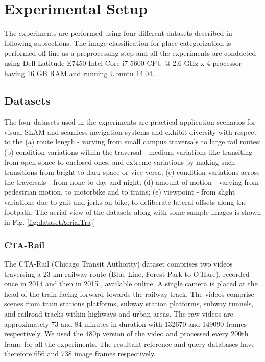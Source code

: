 \documentclass[letterpaper, 10 pt, conference]{ieeeconf}  %
\begin{document}
\section{Experimental Setup}
The experiments are performed using four different datasets described in following subsections. The image classification for place categorization is performed off-line as a preprocessing step and all the experiments are conducted using Dell Latitude E7450 Intel Core i7-5600 CPU @ 2.6 GHz x 4 processor having 16 GB RAM and running Ubuntu 14.04.

\subsection{Datasets}
The four datasets used in the experiments are practical application scenarios for visual SLAM and seamless navigation systems and exhibit diversity with respect to the (a) route length - varying from small campus traversals to large rail routes; (b) condition variations within the traversal - medium variations like transiting from open-space to enclosed ones, and extreme variations by making such transitions from bright to dark space or vice-versa; (c) condition variations across the traversals - from none to day and night; (d) amount of motion - varying from pedestrian motion, to motorbike and to trains; (e) viewpoint - from slight variations due to gait and jerks on bike, to deliberate lateral offsets along the footpath. The aerial view of the datasets along with some sample images is shown in Fig. \ref{fig:datasetAerialTraj}
\subsubsection{CTA-Rail}
The CTA-Rail (Chicago Transit Authority) dataset comprises two videos traversing a 23 km railway route (Blue Line, Forest Park to O'Hare), recorded once in 2014 and then in 2015 \cite{ctaRail2015}, available online. A single camera is placed at the head of the train facing forward towards the railway track. The videos comprise scenes from train stations platforms, subway station platforms, subway tunnels, and railroad tracks within highways and urban areas. The raw videos are approximately 73 and 84 minutes in duration with 132670 and 149090 frames respectively. We used the 480p version of the video and processed every 200th frame for all the experiments. The resultant reference and query databases have therefore 656 and 738 image frames respectively.
\end{document}
